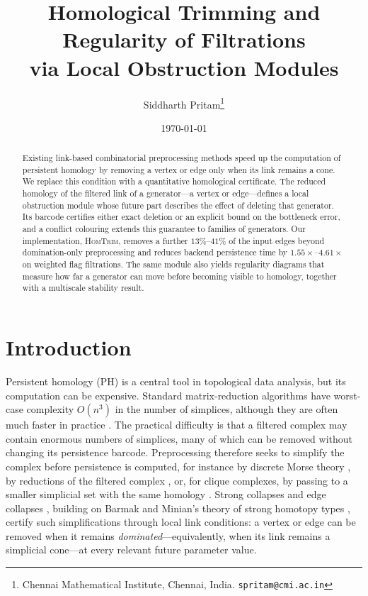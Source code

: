 \documentclass[11pt,letterpaper]{article}
\title{Homological Trimming and Regularity of Filtrations\\
       via Local Obstruction Modules}
\author{Siddharth Pritam\thanks{Chennai Mathematical Institute, Chennai, India.
  \texttt{spritam@cmi.ac.in}}}
\date{\today}
\theoremstyle{definition}
\begin{document}
\maketitle
\begin{abstract}
Existing link-based combinatorial preprocessing methods speed up the computation
of persistent homology by removing a vertex or edge only when its link remains
a cone. We replace this condition with a quantitative homological certificate.
The reduced homology of the filtered link of a generator---a vertex or
edge---defines a local obstruction module whose future part describes the
effect of deleting that generator. Its barcode certifies either exact deletion
or an explicit bound on the bottleneck error, and a conflict colouring extends
this guarantee to families of generators. Our implementation,
\textsc{HomTrim}, removes a further $13\%–41\%$ of the input edges beyond domination-only preprocessing and reduces backend persistence time by
$1.55\times$--$4.61\times$ on weighted flag filtrations. The same module also
yields regularity diagrams that measure how far a generator can move before
becoming visible to homology, together with a multiscale stability result.

\end{abstract}


\section{Introduction}
\label{sec:intro}
Persistent homology (PH) is a central tool in topological data analysis, but
its computation can be expensive. Standard matrix-reduction algorithms have
worst-case complexity $O(n^3)$ in the number of simplices, although they are
often much faster in practice
\cite{ZomorodianCarlsson2005,EdelsbrunnerHarer2010}. The practical difficulty is
that a filtered complex may contain enormous numbers of simplices, many of
which can be removed without changing its persistence barcode. Preprocessing
therefore seeks to simplify the complex before persistence is computed, for
instance by discrete Morse theory \cite{MischaikowNanda2013}, by reductions of
the filtered complex \cite{DlotkoWagner2014}, or, for clique complexes, by
passing to a smaller simplicial set with the same homology
\cite{Zomorodian2010}. Strong collapses and edge collapses
\cite{BoissonnatPritamPareek2018,BoissonnatPritam2019,BoissonnatPritam2020,GlissePritam2022},
building
on Barmak and Minian's theory of strong homotopy types
\cite{BarmakMinian2012}, certify such simplifications through local link
conditions: a vertex or edge can be removed when it remains
\emph{dominated}---equivalently, when its link remains a simplicial cone---at
every relevant future parameter value.
\end{document}
